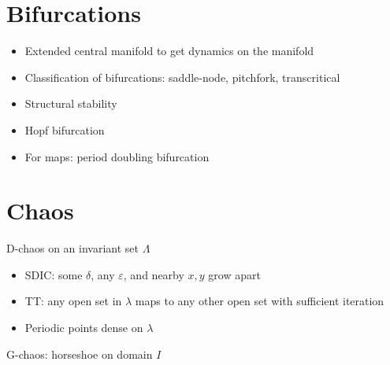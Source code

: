 \section{Bifurcations}
\begin{itemize}
    \item Extended central manifold to get dynamics on the manifold
    \item Classification of bifurcations: saddle-node, pitchfork, transcritical
    \item Structural stability
    \item Hopf bifurcation
    \item For maps: period doubling bifurcation
\end{itemize}
\section{Chaos}
D-chaos on an invariant set $\Lambda$
\begin{itemize}
    \item SDIC: some $\delta$, any $\varepsilon$, and nearby $x,y$ grow apart
    \item TT: any open set in $\lambda$ maps to any other open set with sufficient iteration
    \item Periodic points dense on $\lambda$
\end{itemize}

G-chaos: horseshoe on domain $I$

